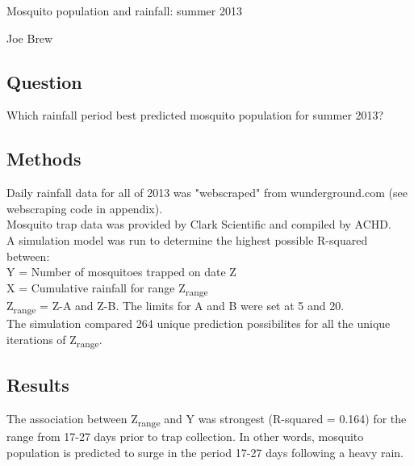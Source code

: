 \documentclass{article}
\begin{document}




\begin{center}
\begin{huge}
Mosquito population and rainfall: summer 2013 \\
\end{huge}

\begin{small}
Joe Brew
\end{small}

\end{center}

\begin{multicols}{2}
\subsection*{Question}
Which rainfall period best predicted mosquito population for summer 2013?\\

\subsection*{Methods}
Daily rainfall data for all of 2013 was "webscraped" from wunderground.com (see webscraping code in appendix).  \\

Mosquito trap data was provided by Clark Scientific and compiled by ACHD. \\

A simulation model was run to determine the highest possible R-squared between:\\

\noindent Y = Number of mosquitoes trapped on date Z \\
\noindent X = Cumulative rainfall for range Z\textsubscript{range}\\
\noindent Z\textsubscript{range} = Z-A and Z-B. The limits for A and B were set at 5 and 20. \\

The simulation compared 264 unique prediction possibilites for all the unique iterations of Z\textsubscript{range}. \\

\subsection*{Results}
The association between Z\textsubscript{range} and Y was strongest (R-squared = 0.164) for the range from 17-27 days prior to trap collection. In other words, mosquito population is predicted to surge in the period 17-27 days following a heavy rain.  

\end{multicols}
\end{document}
